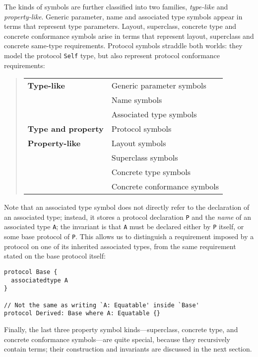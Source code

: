 \documentclass[../generics]{subfiles}
\begin{document}
%
%
The kinds of symbols are further classified into two families, \emph{type-like} and \emph{property-like}. Generic parameter, name and associated type symbols appear in terms that represent type parameters. Layout, superclass, concrete type and concrete conformance symbols arise in terms that represent layout, superclass and concrete same-type requirements. Protocol symbols straddle both worlds: they model the protocol \texttt{Self} type, but also represent protocol conformance requirements:
\begin{quote}
\begin{tabular}{|l|l|}
\hline
\textbf{Type-like}&Generic parameter symbols\\
&Name symbols\\
&Associated type symbols\\
\hline
\textbf{Type and property}& Protocol symbols\\
\hline
\textbf{Property-like}&Layout symbols\\
&Superclass symbols\\
&Concrete type symbols\\
&Concrete conformance symbols\\
\hline
\end{tabular}
\end{quote}
%
%
%
%
Note that an associated type symbol does not directly refer to the declaration of an associated type; instead, it stores a protocol declaration \texttt{P} and the \emph{name} of an associated type \texttt{A}; the invariant is that \texttt{A} must be declared either by \texttt{P} itself, or some base protocol of \texttt{P}. This allows us to distinguish a requirement imposed by a protocol on one of its inherited associated types, from the same requirement stated on the base protocol itself:
\begin{Verbatim}
protocol Base {
  associatedtype A
}

// Not the same as writing `A: Equatable' inside `Base'
protocol Derived: Base where A: Equatable {}
\end{Verbatim}
Finally, the last three property symbol kinds---superclass, concrete type, and concrete conformance symbols---are quite special, because they recursively contain terms; their construction and invariants are discussed in the next section.
\end{document}
